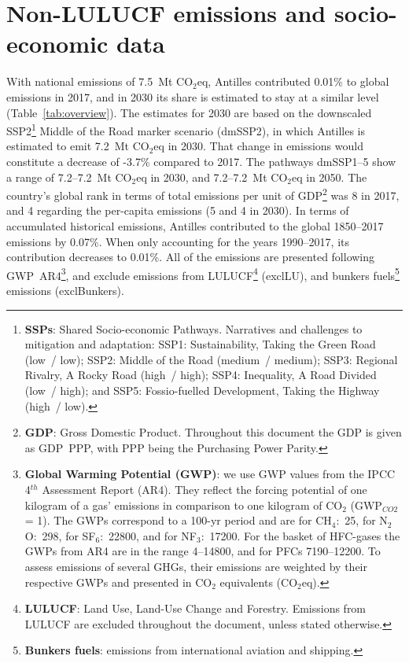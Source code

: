 \documentclass[12pt]{article}
\begin{document}
 \section{Non-LULUCF emissions and socio-economic data}
 \label{sec:nonLULUCFSocioEco}
 With national emissions of 7.5~Mt CO$_2$eq, Antilles contributed 0.01\% to global emissions in 2017, and in 2030 its share is estimated to stay at a similar level (Table~\ref{tab:overview}).
 The estimates for 2030 are based on the downscaled SSP2\footnote{\textbf{SSPs}: Shared Socio-economic Pathways.
 Narratives and challenges to mitigation and adaptation: 
 SSP1: Sustainability, Taking the Green Road (low~/ low);
 SSP2: Middle of the Road (medium~/ medium);
 SSP3: Regional Rivalry, A Rocky Road (high~/ high);
 SSP4: Inequality, A Road Divided (low~/ high); and
 SSP5: Fossio-fuelled Development, Taking the Highway (high~/ low).} Middle of the Road marker scenario (dmSSP2), in which Antilles is estimated to emit 7.2~Mt CO$_2$eq in 2030.
 That change in emissions would constitute a decrease of -3.7\% compared to 2017. 
 The pathways dmSSP1--5 show a range of 7.2--7.2~Mt CO$_2$eq in 2030, and 7.2--7.2~Mt CO$_2$eq in 2050.
 The country's global rank in terms of total emissions per unit of GDP\footnote{\textbf{GDP}: Gross Domestic Product. 
 Throughout this document the GDP is given as GDP~PPP, with PPP being the Purchasing Power Parity.} was 8 in 2017, and 4 regarding the per-capita emissions (5 and 4 in 2030).
 In terms of accumulated historical emissions, Antilles contributed to the global 1850--2017 emissions by 0.07\%. 
 When only accounting for the years 1990--2017, its contribution decreases to 0.01\%.
 All of the emissions are presented following GWP~AR4\footnote{\textbf{Global Warming Potential (GWP)}: we use GWP values from the IPCC 4$^{th}$ Assessment Report (AR4). 
 They reflect the forcing potential of one kilogram of a gas' emissions in comparison to one kilogram of CO$_2$ (GWP$_{CO2}$ = 1). 
 The GWPs correspond to a 100-yr period and are for CH$_4$:~25, for N$_2$O:~298, for SF$_6$:~22800, and for NF$_3$:~17200. 
 For the basket of HFC-gases the GWPs from AR4 are in the range 4--14800, and for PFCs 7190--12200. 
 To assess emissions of several GHGs, their emissions are weighted by their respective GWPs and presented in CO$_2$ equivalents (CO$_2$eq).}, and exclude emissions from LULUCF\footnote{\textbf{LULUCF}: Land Use, Land-Use Change and Forestry. 
 Emissions from LULUCF are excluded throughout the document, unless stated otherwise.} (exclLU), and bunkers fuels\footnote{\textbf{Bunkers fuels}: emissions from international aviation and shipping.} emissions (exclBunkers).
\end{document}
